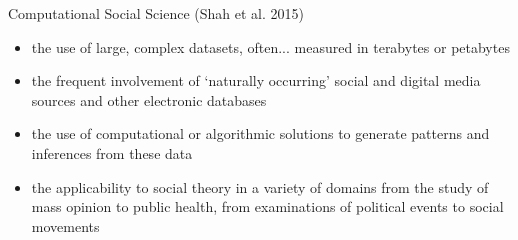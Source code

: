 \documentclass{beamer}
\begin{document}
\begin{frame}{Computational Social Science (Shah et al. 2015)}
  \begin{itemize}[<+->]
    \item the use of large, complex datasets, often... measured in terabytes or petabytes
    \item the frequent involvement of `naturally occurring' social and digital media sources and other electronic databases
    \item the use of computational or algorithmic solutions to generate patterns and inferences from these data
    \item the applicability to social theory in a variety of domains from the study of mass opinion to public health, from examinations of political events to social movements
  \end{itemize}
\end{frame}
\end{document}
